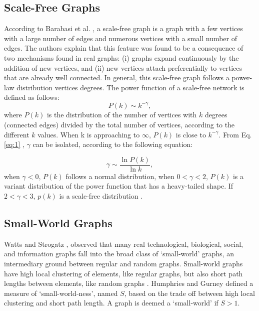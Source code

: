\subsection{Scale-Free Graphs}
\label{sec:scale_free}
According to Barabasi et al. \cite{Barabasi509}, a scale-free graph is a graph with a few vertices with a large number of edges and numerous vertices with a small number of edges. The authors explain that this feature  was found to be a consequence of two mechanisms found in real graphs: (i) graphs expand continuously by the addition of new vertices, and (ii) new vertices attach preferentially to vertices that are already well connected. In general, this scale-free  graph follows a power-law distribution vertices degrees. The power function of a scale-free network is defined as follows:
\begin{equation}\label{eq:1}
P(k) \sim k ^{-\gamma},
\end{equation}
where $P(k)$ is the distribution of the number of vertices with $k$ degrees (connected edges) divided by the total number of vertices, according to the different $k$ values. When k is approaching to $\infty$, $P(k)$ is close to $k^{-\gamma}$. From Eq. \ref{eq:1} , $\gamma$ can be isolated, according to the following equation:

\begin{equation}\label{eq:2}
\gamma \sim \frac{\ln P(k)}{\ln k},
\end{equation}
when $\gamma <0$, $P(k)$ follows a normal distribution, when $0 < \gamma < 2$, $P(k)$ is a variant distribution of the power function that has a heavy-tailed shape. If $2 < \gamma <3$, $p(k)$ is a scale-free distribution \cite{PARK201632}.




\subsection{Small-World Graphs} 
\label{sec:small_worlds}
Watts and Strogatz \cite{Watts1998}, observed that many real technological, biological, social, and information graphs fall into the broad class of ‘small-world’ graphs, an intermediary  ground between regular and random graphs. Small-world graphs  have high local clustering of elements, like  regular graphs, but also short path lengths between elements, like random graphs \cite{Humphries2010}. Humphries and Gurney \cite{Humphries2010}  defined a  measure of ‘small-world-ness’, named $S$, based on the trade off between high local clustering and short path length. A  graph is  deemed a ‘small-world’ if $S>1$.
 
